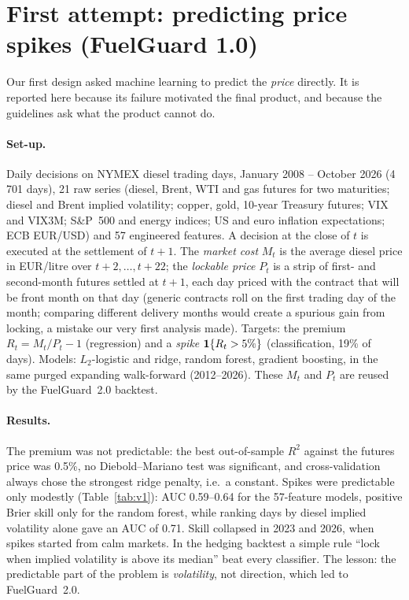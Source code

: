 \section{First attempt: predicting price spikes (FuelGuard 1.0)}\label{app:v1}

Our first design asked machine learning to predict the \emph{price} directly. It is reported here because
its failure motivated the final product, and because the guidelines ask what the product cannot do.

\paragraph{Set-up.} Daily decisions on NYMEX diesel trading days, January 2008 -- October 2026 (4\,701
days), 21 raw series (diesel, Brent, WTI and gas futures for two maturities; diesel and Brent implied
volatility; copper, gold, 10-year Treasury futures; VIX and VIX3M; S\&P~500 and energy indices; US and euro
inflation expectations; ECB EUR/USD) and 57 engineered features. A decision at the close of $t$ is executed
at the settlement of $t+1$. The \emph{market cost} $M_t$ is the average diesel price in EUR/litre over
$t+2,\dots,t+22$; the \emph{lockable price} $P_t$ is a strip of first- and second-month futures settled at
$t+1$, each day priced with the contract that will be front month on that day (generic contracts roll on
the first trading day of the month; comparing different delivery months would create a spurious gain from
locking, a mistake our very first analysis made). Targets: the premium $R_t=M_t/P_t-1$ (regression) and a
\emph{spike} $\mathbf{1}\{R_t>5\%\}$ (classification, 19\% of days). Models: $L_2$-logistic and ridge, random forest,
gradient boosting, in the same purged expanding walk-forward (2012--2026). These $M_t$ and $P_t$ are reused
by the FuelGuard~2.0 backtest.

\paragraph{Results.} The premium was not predictable: the best out-of-sample $R^2$ against the futures price
was 0.5\%, no Diebold--Mariano test was significant, and cross-validation always chose the strongest ridge
penalty, i.e.\ a constant. Spikes were predictable only modestly (Table~\ref{tab:v1}): AUC 0.59--0.64 for the
57-feature models, positive Brier skill only for the random forest, while ranking days by diesel implied
volatility alone gave an AUC of 0.71. Skill collapsed in 2023 and 2026, when spikes started from calm
markets. In the hedging backtest a simple rule ``lock when implied volatility is above its median''
beat every classifier. The lesson: the predictable part of the problem is \emph{volatility}, not direction,
which led to FuelGuard~2.0.

\begin{table}[H]
\centering\small
{}
\caption{FuelGuard 1.0, spike classification out of sample 2012--2026 (3\,725 days). The one-feature
implied-volatility logistic was added after a first run. Last row: days ranked by implied volatility, no model.}
\label{tab:v1}
\end{table}
